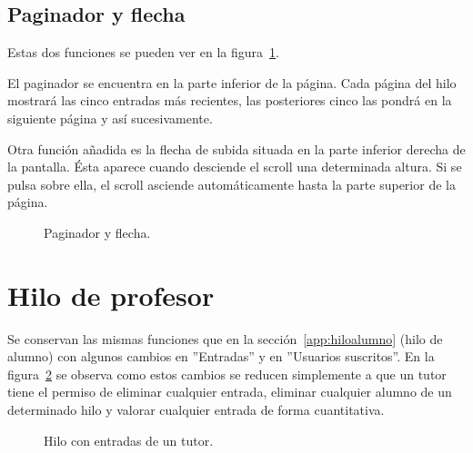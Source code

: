 \documentclass[a4paper, 12pt]{book}
\begin{document}
\subsection{Paginador y flecha}
Estas dos funciones se pueden ver en la figura~\ref{figura:hiloalumno5}.

El paginador se encuentra en la parte inferior de la p\'agina. Cada p\'agina del hilo mostrar\'a las cinco entradas m\'as recientes, las posteriores cinco 
las pondr\'a en la siguiente p\'agina y as\'i sucesivamente.

Otra funci\'on a\~nadida es la flecha de subida situada en la parte inferior derecha de la pantalla. \'Esta aparece cuando desciende el scroll una 
determinada altura. Si se pulsa sobre ella, el scroll asciende autom\'aticamente hasta la parte superior de la p\'agina.
\begin{figure}[htbp] 
  \centering
  \caption{Paginador y flecha.}
  \label{figura:hiloalumno5}
\end{figure}

\section{Hilo de profesor}
Se conservan las mismas funciones que en la secci\'on~\ref{app:hiloalumno} (hilo de alumno) con algunos cambios en ''Entradas'' y en ''Usuarios 
suscritos''. En la figura~\ref{figura:hiloprofesor} se observa como estos cambios se reducen simplemente a que un tutor tiene el permiso de eliminar 
cualquier entrada, eliminar cualquier alumno de un determinado hilo y valorar cualquier entrada de forma cuantitativa.
\begin{figure}[htbp] 
  \centering
  \caption{Hilo con entradas de un tutor.}
  \label{figura:hiloprofesor}
\end{figure}
\end{document}
